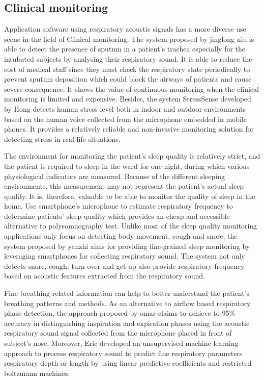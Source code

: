 \subsection{Clinical monitoring}
Application software using respiratory acoustic signals has a more diverse use scene in the field of Clinical monitoring. The system proposed by jinglong niu is able to detect the presence of sputum in a patient’s trachea especially for the intubated subjects by analysing their respiratory sound. It is able to reduce the cost of medical staff since they must check the respiratory state periodically to prevent sputum deposition which could block the airways of patients and cause severe consequence.\cite{Niu2019AState} It shows the value of continuous monitoring when the clinical monitoring is limited and expensive. 
Besides, the system StressSense developed by Hong detects human stress level both in indoor and outdoor environments based on the human voice collected from the microphone embedded in mobile phones. It provides a relatively reliable and non-invasive monitoring solution for detecting stress in real-life situations.\cite{Lu2012StressSense:Smartphones}

The environment for monitoring the patient's sleep quality is relatively strict, and the patient is required to sleep in the ward for one night, during which various physiological indicators are measured. Because of the different sleeping environments, this measurement may not represent the patient's actual sleep quality. It is, therefore, valuable to be able to monitor the quality of sleep in the home. Use smartphone’s microphone to estimate respiratory frequency to determine patients’ sleep quality which provides an cheap and accessible alternative to polysomnography test.\cite{Kaur2017UseRespiration} Unlike most of the sleep quality monitoring applications only focus on detecting body movement, cough and snore, the system proposed by yanzhi aims for providing fine-grained sleep monitoring by leveraging smartphones for collecting respiratory sound. The system not only detects snore, cough, turn over and get up also provide respiratory frequency based on acoustic features extracted from the respiratory sound.\cite{Ren2015Fine-grainedSmartphones}

Fine breathing-related information can help to better understand the patient's breathing patterns and methods. As an alternative to airflow based respiratory phase detection, the approach proposed by omar claims to achieve to 95\% accuracy in distinguishing inspiration and expiration phases using the acoustic respiratory sound signal collected from the microphone placed in front of subject’s nose.\cite{Yahya2014AutomaticCycles} Moreover, Eric developed an unsupervised machine learning approach to process respiratory sound to predict fine respiratory parameters respiratory depth or length by using linear predictive coefficients and restricted boltzmann machines. \cite{Hamke2019DetectingMachines}

